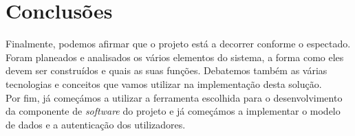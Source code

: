 \documentclass[a4paper,openright,twoside,11pt]{report}
\begin{document}
\cleardoublepage
\tableofcontents \cleardoublepage



\setcounter{page}{1}









%

%

\chapter{Conclusões} \label{cap:conc}
Finalmente, podemos afirmar que o projeto está a decorrer conforme o espectado. Foram planeados e analisados os vários elementos do sistema, a forma como eles devem ser construídos e quais as suas funções. Debatemos também as várias tecnologias e conceitos que vamos utilizar na implementação desta solução.\\
Por fim, já começámos a utilizar a ferramenta escolhida para o desenvolvimento da componente de \textit{software} do projeto e já começámos a implementar o modelo de dados e a autenticação dos utilizadores.

\nocite{*}



%
\end{document}
